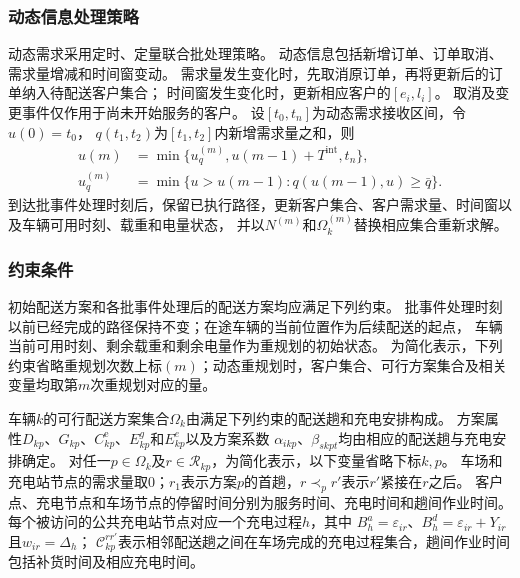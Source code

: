 \documentclass{setp-new}
\begin{document}
\subsubsection{动态信息处理策略}

动态需求采用定时、定量联合批处理策略\cite{ref:71}。
动态信息包括新增订单、订单取消、需求量增减和时间窗变动。
需求量发生变化时，先取消原订单，再将更新后的订单纳入待配送客户集合；
时间窗发生变化时，更新相应客户的$[e_i,l_i]$。
取消及变更事件仅作用于尚未开始服务的客户。
设$[t_0,t_n]$为动态需求接收区间，令$u(0)=t_0$，
$q(t_1,t_2)$为$[t_1,t_2]$内新增需求量之和，则
\begin{align}
u(m)
&=\min\{u_q^{(m)},u(m-1)+T^{\mathrm{int}},t_n\},
\label{eq:unified-trigger-time}\\
u_q^{(m)}
&=\min\{u>u(m-1):q(u(m-1),u)\ge\bar q\}.
\label{eq:unified-trigger-quantity}
\end{align}
到达批事件处理时刻后，保留已执行路径，更新客户集合、客户需求量、时间窗以及车辆可用时刻、载重和电量状态，
并以$N^{(m)}$和$\Omega_k^{(m)}$替换相应集合重新求解。

\subsubsection{约束条件}

初始配送方案和各批事件处理后的配送方案均应满足下列约束。
批事件处理时刻以前已经完成的路径保持不变；在途车辆的当前位置作为后续配送的起点，
车辆当前可用时刻、剩余载重和剩余电量作为重规划的初始状态。
为简化表示，下列约束省略重规划次数上标$(m)$；动态重规划时，客户集合、可行方案集合及相关变量均取第$m$次重规划对应的量。

车辆$k$的可行配送方案集合$\Omega_k$由满足下列约束的配送趟和充电安排构成。
方案属性$D_{kp}$、$G_{kp}$、$C_{kp}^{\mathrm e}$、$E_{kp}^{g}$和$E_{kp}^{e}$以及方案系数
$\alpha_{ikp}$、$\beta_{skpt}$均由相应的配送趟与充电安排确定。
对任一$p\in\Omega_k$及$r\in\mathcal R_{kp}$，为简化表示，以下变量省略下标$k,p$。
车场和充电站节点的需求量取0；$r_1$表示方案$p$的首趟，$r\prec_p r'$表示$r'$紧接在$r$之后。
客户点、充电节点和车场节点的停留时间分别为服务时间、充电时间和趟间作业时间。
每个被访问的公共充电站节点对应一个充电过程$h$，其中
$B_h^{a}=\varepsilon_{ir}$、$B_h^{d}=\varepsilon_{ir}+Y_{ir}$且$w_{ir}=\Delta_h$；
$\mathcal C_{kp}^{rr'}$表示相邻配送趟之间在车场完成的充电过程集合，趟间作业时间包括补货时间及相应充电时间。
\end{document}

